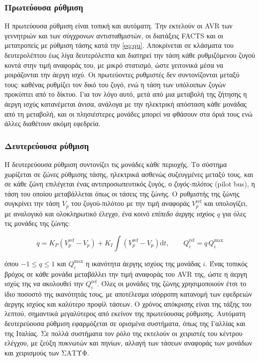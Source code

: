 \subsubsection{Πρωτεύουσα ρύθμιση}

Η πρωτεύουσα ρύθμιση είναι τοπική και αυτόματη. Την εκτελούν οι AVR των γεννητριών και των
σύγχρονων αντισταθμιστών, οι διατάξεις FACTS και οι μετατροπείς με ρύθμιση τάσης κατά την
\eqref{eq:qu}. Αποκρίνεται σε κλάσματα του δευτερολέπτου έως λίγα δευτερόλεπτα και διατηρεί
την τάση κάθε ρυθμιζόμενου ζυγού κοντά στην τιμή αναφοράς του, με μικρό στατισμό, ώστε
γειτονικά μέσα να μοιράζονται την άεργη ισχύ. Οι πρωτεύοντες ρυθμιστές δεν συντονίζονται μεταξύ
τους: καθένας ρυθμίζει τον δικό του ζυγό, ενώ η τάση των υπόλοιπων ζυγών προκύπτει από το
δίκτυο. Για τον λόγο αυτό, μετά από μια μεταβολή της ζήτησης η άεργη ισχύς κατανέμεται άνισα,
ανάλογα με την ηλεκτρική απόσταση κάθε μονάδας από τη μεταβολή, και οι πλησιέστερες μονάδες
μπορεί να φθάσουν στα όριά τους ενώ άλλες διαθέτουν ακόμη εφεδρεία.

\subsubsection{Δευτερεύουσα ρύθμιση}

Η δευτερεύουσα ρύθμιση συντονίζει τις μονάδες κάθε περιοχής. Το σύστημα χωρίζεται σε
\emph{ζώνες} ρύθμισης τάσης, ηλεκτρικά ασθενώς συζευγμένες μεταξύ τους, και σε κάθε ζώνη
επιλέγεται ένας αντιπροσωπευτικός ζυγός, ο \emph{ζυγός-πιλότος} (pilot bus), η τάση του οποίου
μεταβάλλεται όπως οι τάσεις της ζώνης. Ο ρυθμιστής της ζώνης συγκρίνει την τάση $V_p$ του
ζυγού-πιλότου με την τιμή αναφοράς $V_p^{\mathrm{ref}}$ και υπολογίζει, με αναλογικό και
ολοκληρωτικό έλεγχο, ένα κοινό \emph{επίπεδο άεργης ισχύος} $q$ για όλες τις μονάδες της ζώνης:

\begin{equation}
q = K_P \left(V_p^{\mathrm{ref}} - V_p\right)
  + K_I \int \left(V_p^{\mathrm{ref}} - V_p\right) \mathrm{d}t, \qquad
Q_i^{\mathrm{ref}} = q\,Q_i^{\max}
\label{eq:svr}
\end{equation}

όπου $-1 \le q \le 1$ και $Q_i^{\max}$ η ικανότητα άεργης ισχύος της μονάδας $i$. Ένας τοπικός
βρόχος σε κάθε μονάδα μεταβάλλει την τιμή αναφοράς του AVR της, ώστε η άεργη ισχύς της να
ακολουθεί την $Q_i^{\mathrm{ref}}$. Όλες οι μονάδες της ζώνης χρησιμοποιούν έτσι το ίδιο ποσοστό
της ικανότητάς τους, με αποτέλεσμα ισόρροπη κατανομή των εφεδρειών άεργης ισχύος και καλύτερο
προφίλ τάσεων. Ο χρόνος απόκρισης είναι της τάξης του λεπτού, σημαντικά μεγαλύτερος από εκείνον
της πρωτεύουσας ρύθμισης. Αυτόματη δευτερεύουσα ρύθμιση εφαρμόζεται σε ορισμένα συστήματα,
όπως της Γαλλίας και της Ιταλίας. Σε πολλά συστήματα τον ρόλο της εκτελούν οι χειριστές του
κέντρου ελέγχου, με ζεύξη πυκνωτών και πηνίων, αλλαγή των τάσεων αναφοράς των μονάδων και
χειρισμούς των ΣΑΤΥΦ.

